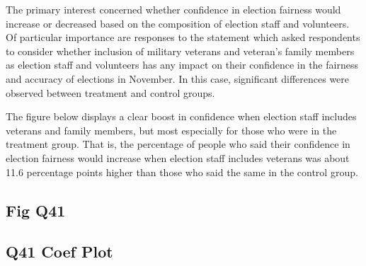 \documentclass[
  11pt,
  a4paper,
]{article}
\begin{document}
The primary interest concerned whether confidence in election fairness
would increase or decreased based on the composition of election staff
and volunteers. Of particular importance are responses to the statement
which asked respondents to consider whether inclusion of military
veterans and veteran's family members as election staff and volunteers
has any impact on their confidence in the fairness and accuracy of
elections in November. In this case, significant differences were
observed between treatment and control groups.

The figure below displays a clear boost in confidence when election
staff includes veterans and family members, but most especially for
those who were in the treatment group. That is, the percentage of people
who said their confidence in election fairness would increase when
election staff includes veterans was about 11.6 percentage points higher
than those who said the same in the control group.

\subsection{Fig Q41}

\begin{figure}


\caption{\label{fig-q41}}

\end{figure}%

\subsection{Q41 Coef Plot}
\end{document}
